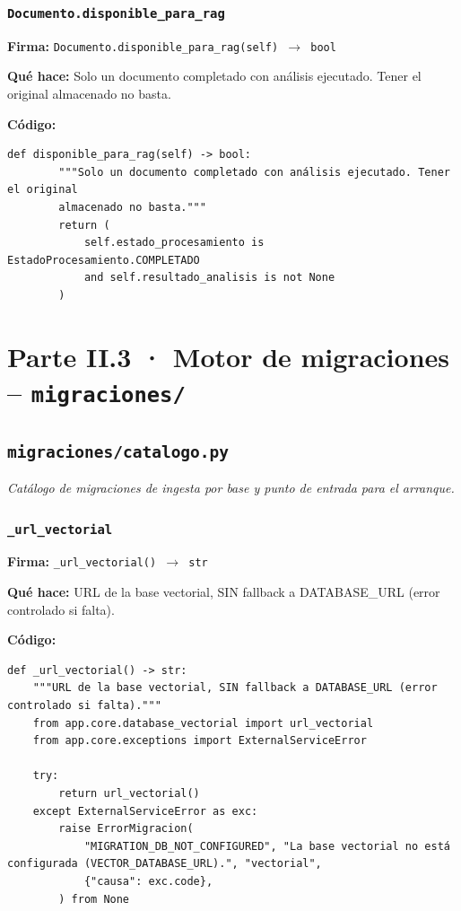 \documentclass[11pt,a4paper]{article}
\begin{document}
\subsubsection*{\texttt{Documento.disponible\_para\_rag}}
\textbf{Firma:} \texttt{Documento.disponible\_para\_rag(self) $\rightarrow$ bool}

\textbf{Qué hace:} Solo un documento completado con análisis ejecutado. Tener el original
almacenado no basta.

\textbf{Código:}
\begin{lstlisting}
def disponible_para_rag(self) -> bool:
        """Solo un documento completado con análisis ejecutado. Tener el original
        almacenado no basta."""
        return (
            self.estado_procesamiento is EstadoProcesamiento.COMPLETADO
            and self.resultado_analisis is not None
        )
\end{lstlisting}

\section{Parte II.3 · Motor de migraciones -- \texttt{migraciones/}}
\subsection{\texttt{migraciones/catalogo.py}}
\textit{Catálogo de migraciones de ingesta por base y punto de entrada para el arranque.}

\subsubsection*{\texttt{\_url\_vectorial}}
\textbf{Firma:} \texttt{\_url\_vectorial() $\rightarrow$ str}

\textbf{Qué hace:} URL de la base vectorial, SIN fallback a DATABASE\_URL (error controlado si falta).

\textbf{Código:}
\begin{lstlisting}
def _url_vectorial() -> str:
    """URL de la base vectorial, SIN fallback a DATABASE_URL (error controlado si falta)."""
    from app.core.database_vectorial import url_vectorial
    from app.core.exceptions import ExternalServiceError

    try:
        return url_vectorial()
    except ExternalServiceError as exc:
        raise ErrorMigracion(
            "MIGRATION_DB_NOT_CONFIGURED", "La base vectorial no está configurada (VECTOR_DATABASE_URL).", "vectorial",
            {"causa": exc.code},
        ) from None
\end{lstlisting}
\end{document}
